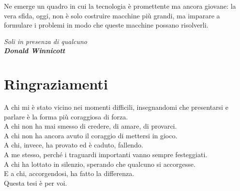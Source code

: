 \documentclass[12pt, a4paper, twoside]{report}
\theoremstyle{definition}
\theoremstyle{remark}
\begin{document}
Ne emerge un quadro in cui la tecnologia è promettente ma ancora giovane: la
vera sfida, oggi, non è solo costruire macchine più grandi, ma imparare a
formulare i problemi in modo che queste macchine possano risolverli.

\newpage
\thispagestyle{empty}
\vspace*{8cm}
\begin{center}\itshape Soli in presenza di qualcuno\\ \textbf{Donald Winnicott}
  \end{center}

\tableofcontents
\listoffigures
\listoftables

\cleardoublepage
{}






\cleardoublepage
{}
{}



\chapter*{Ringraziamenti}
  A chi mi è stato vicino nei momenti difficili, insegnandomi che presentarsi e parlare è la forma più coraggiosa di forza.\\
  A chi non ha mai smesso di credere, di amare, di provarci.\\
  A chi non ha ancora avuto il coraggio di mettersi in gioco.\\
  A chi, invece, ha provato ed è caduto, fallendo.\\[\bigskipamount]
  A me stesso, perché i traguardi importanti vanno sempre festeggiati.\\[\bigskipamount]
  A chi ha lottato in silenzio, sperando che qualcuno si accorgesse.\\
  E a chi, accorgendosi, ha fatto la differenza.\\[\bigskipamount]
  Questa tesi è per voi.
\end{document}
